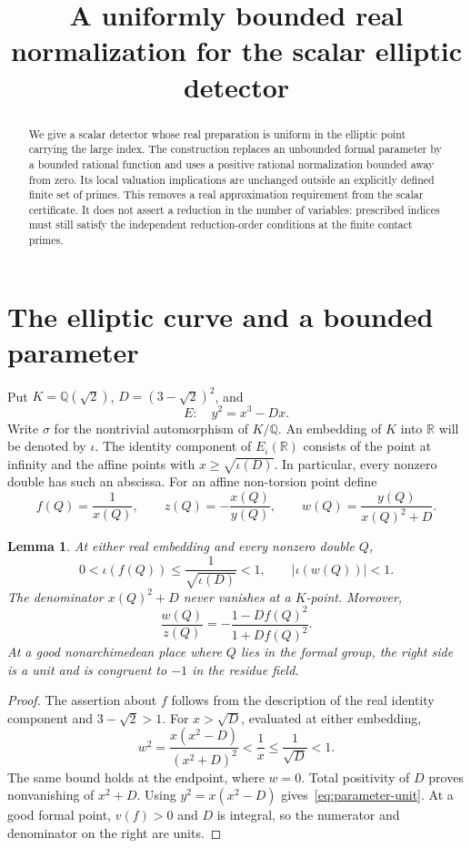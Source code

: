\documentclass[11pt]{article}
\title{A uniformly bounded real normalization for the scalar elliptic detector}
\author{}\date{}
\newtheorem{lemma}[theorem]{Lemma}
\theoremstyle{remark}\newtheorem{remark}[theorem]{Remark}
\newcommand{\Q}{\mathbb Q}\newcommand{\Z}{\mathbb Z}
\newcommand{\R}{\mathbb R}\newcommand{\vpp}{v_p}
\begin{document}
\maketitle
\begin{abstract}
We give a scalar detector whose real preparation is uniform in the
elliptic point carrying the large index.  The construction replaces an
unbounded formal parameter by a bounded rational function and uses a
positive rational normalization bounded away from zero.  Its local
valuation implications are unchanged outside an explicitly defined
finite set of primes.  This removes a real approximation requirement
from the scalar certificate.  It does not assert a reduction in the
number of variables: prescribed indices must still satisfy the
independent reduction-order conditions at the finite contact primes.
\end{abstract}

\section{The elliptic curve and a bounded parameter}

Put $K=\Q(\sqrt2)$, $D=(3-\sqrt2)^2$, and
\[
 E:\quad y^2=x^3-Dx.
\]
Write $\sigma$ for the nontrivial automorphism of $K/\Q$.
An embedding of $K$ into $\R$ will be denoted by $\iota$.
The identity component of $E_\iota(\R)$ consists of the point at
infinity and the affine points with $x\ge\sqrt{\iota(D)}$.
In particular, every nonzero double has such an abscissa.
For an affine non-torsion point define
\[
 f(Q)=\frac1{x(Q)},\qquad z(Q)=-\frac{x(Q)}{y(Q)},\qquad
 w(Q)=\frac{y(Q)}{x(Q)^2+D}.
\]

\begin{lemma}\label{lem:bounded}
At either real embedding and every nonzero double $Q$,
\[
 0<\iota(f(Q))\le\frac1{\sqrt{\iota(D)}}<1,
 \qquad |\iota(w(Q))|<1.
\]
The denominator $x(Q)^2+D$ never vanishes at a $K$-point.
Moreover,
\begin{equation}\label{eq:parameter-unit}
 \frac{w(Q)}{z(Q)}
 =-\frac{1-Df(Q)^2}{1+Df(Q)^2}.
\end{equation}
At a good nonarchimedean place where $Q$ lies in the formal group,
the right side is a unit and is congruent to $-1$ in the residue field.
\end{lemma}
\begin{proof}
The assertion about $f$ follows from the description of the real
identity component and $3-\sqrt2>1$.  For $x>\sqrt D$, evaluated
at either embedding,
\[
 w^2=\frac{x(x^2-D)}{(x^2+D)^2}<\frac1x
 \le\frac1{\sqrt D}<1.
\]
The same bound holds at the endpoint, where $w=0$.
Total positivity of $D$ proves nonvanishing of $x^2+D$.
Using $y^2=x(x^2-D)$ gives~\eqref{eq:parameter-unit}.
At a good formal point, $v(f)>0$ and $D$ is integral, so the
numerator and denominator on the right are units.
\end{proof}
\end{document}
